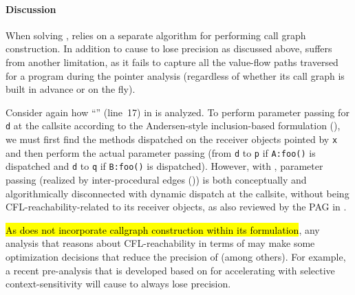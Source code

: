 
\paragraph{Discussion}
\label{sec:manuLFC+sep}

When solving ,
 \manuLFC relies on a separate algorithm for performing 
 call graph construction. In addition to cause
  to lose precision as discussed above, \manuLFC
 suffers from another limitation, as it fails to
capture all the value-flow paths traversed for a program during the pointer  analysis (regardless of whether its call graph is built in advance or on the fly).  


Consider again how ``'' (line~17) in  is analyzed. To perform parameter passing for \texttt{d} at the callsite
according to the Andersen-style  inclusion-based
formulation (), we must first find the  methods dispatched on
the receiver objects pointed by \texttt{x}
and then perform the actual parameter passing (from  \texttt{d} to \texttt{p} if
\texttt{A:foo()} is dispatched and
\texttt{d} to \texttt{q} if
\texttt{B:foo()} is dispatched). However, with \manuLFC,  parameter passing (realized by inter-procedural
 edges ()) is both conceptually and algorithmically
disconnected with dynamic dispatch at the callsite, without being CFL-reachability-related
to its receiver objects, as also reviewed by the PAG in .

\hl{As \manuLFC does not incorporate callgraph construction within its formulation},
any  analysis that reasons about  CFL-reachability in terms of \manuLFC  may
make some optimization decisions 
that reduce  the precision of  (among others). For example, a recent
pre-analysis  \cite{lu2021selective} that is developed based
on \manuLFC for accelerating  with selective context-sensitivity  will   cause  to always lose precision.

